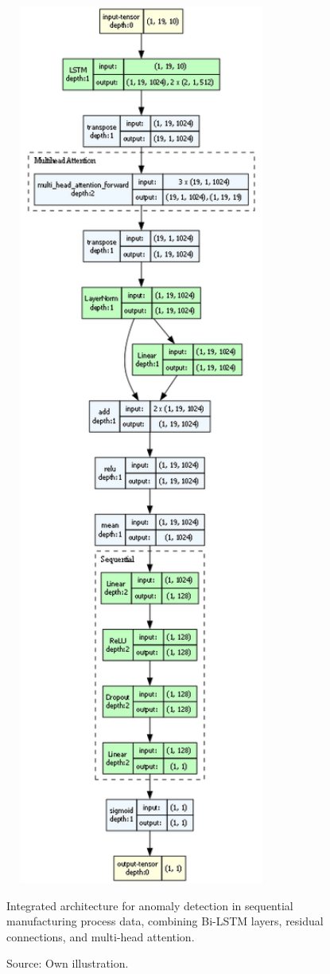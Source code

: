 \begin{figure}
  \centering
  \includegraphics[width=0.8\textwidth]{figures/architecture.png}
  \caption{Integrated architecture for anomaly detection in sequential manufacturing process data, combining Bi-LSTM layers, residual connections, and multi-head attention.}
  \caption*{Source: Own illustration.}
  \label{fig:integrated_architecture}
\end{figure}

